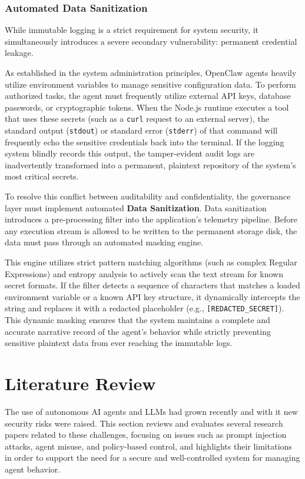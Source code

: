 \documentclass[a4paper]{report}
\begin{document}
\subsubsection{Automated Data Sanitization}

While immutable logging is a strict requirement for system security, it simultaneously introduces a severe secondary vulnerability: permanent credential leakage.

As established in the system administration principles, OpenClaw agents heavily utilize environment variables to manage sensitive configuration data. To perform authorized tasks, the agent must frequently utilize external API keys, database passwords, or cryptographic tokens. When the Node.js runtime executes a tool that uses these secrets (such as a \texttt{curl} request to an external server), the standard output (\texttt{stdout}) or standard error (\texttt{stderr}) of that command will frequently echo the sensitive credentials back into the terminal. If the logging system blindly records this output, the tamper-evident audit logs are inadvertently transformed into a permanent, plaintext repository of the system's most critical secrets.

To resolve this conflict between auditability and confidentiality, the governance layer must implement automated \textbf{Data Sanitization}. Data sanitization introduces a pre-processing filter into the application's telemetry pipeline. Before any execution stream is allowed to be written to the permanent storage disk, the data must pass through an automated masking engine.

This engine utilizes strict pattern matching algorithms (such as complex Regular Expressions) and entropy analysis to actively scan the text stream for known secret formats. If the filter detects a sequence of characters that matches a loaded environment variable or a known API key structure, it dynamically intercepts the string and replaces it with a redacted placeholder (e.g., \texttt{[REDACTED\_SECRET]}). This dynamic masking ensures that the system maintains a complete and accurate narrative record of the agent's behavior while strictly preventing sensitive plaintext data from ever reaching the immutable logs.
\newpage
\section{Literature Review}

The use of autonomous AI agents and LLMs had grown recently and with it new security risks were raised. This section reviews and evaluates several research papers related to these challenges, focusing on issues such as prompt injection attacks, agent misuse, and policy-based control, and highlights their limitations in order to support the need for a secure and well-controlled system for managing agent behavior.
\end{document}
